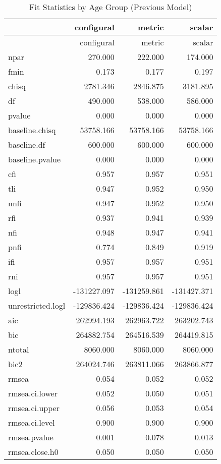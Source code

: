 \documentclass[
  letterpaper,
  DIV=11,
  numbers=noendperiod]{scrartcl}
\begin{document}
\begin{longtable}[]{@{}lrrr@{}}
\caption{Fit Statistics by Age Group (Previous Model)}\tabularnewline
\toprule\noalign{}
& configural & metric & scalar \\
\midrule\noalign{}
\endfirsthead
\toprule\noalign{}
& configural & metric & scalar \\
\midrule\noalign{}
\endhead
\bottomrule\noalign{}
\endlastfoot
npar & 270.000 & 222.000 & 174.000 \\
fmin & 0.173 & 0.177 & 0.197 \\
chisq & 2781.346 & 2846.875 & 3181.895 \\
df & 490.000 & 538.000 & 586.000 \\
pvalue & 0.000 & 0.000 & 0.000 \\
baseline.chisq & 53758.166 & 53758.166 & 53758.166 \\
baseline.df & 600.000 & 600.000 & 600.000 \\
baseline.pvalue & 0.000 & 0.000 & 0.000 \\
cfi & 0.957 & 0.957 & 0.951 \\
tli & 0.947 & 0.952 & 0.950 \\
nnfi & 0.947 & 0.952 & 0.950 \\
rfi & 0.937 & 0.941 & 0.939 \\
nfi & 0.948 & 0.947 & 0.941 \\
pnfi & 0.774 & 0.849 & 0.919 \\
ifi & 0.957 & 0.957 & 0.951 \\
rni & 0.957 & 0.957 & 0.951 \\
logl & -131227.097 & -131259.861 & -131427.371 \\
unrestricted.logl & -129836.424 & -129836.424 & -129836.424 \\
aic & 262994.193 & 262963.722 & 263202.743 \\
bic & 264882.754 & 264516.539 & 264419.815 \\
ntotal & 8060.000 & 8060.000 & 8060.000 \\
bic2 & 264024.746 & 263811.066 & 263866.877 \\
rmsea & 0.054 & 0.052 & 0.052 \\
rmsea.ci.lower & 0.052 & 0.050 & 0.051 \\
rmsea.ci.upper & 0.056 & 0.053 & 0.054 \\
rmsea.ci.level & 0.900 & 0.900 & 0.900 \\
rmsea.pvalue & 0.001 & 0.078 & 0.013 \\
rmsea.close.h0 & 0.050 & 0.050 & 0.050 \\

\end{longtable}
\end{document}
